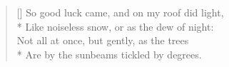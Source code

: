 \documentclass[MAIN]{subfiles}
\begin{document}
\settowidth{\versewidth}{So good luck came, and on my roof did light,}
\begin{verse}[\versewidth]
So good luck came, and on my roof did light,\\*
Like noiseless snow, or as the dew of night:\\
Not all at once, but gently, as the trees\\*
Are by the sunbeams tickled by degrees.
\end{verse}
\end{document}
